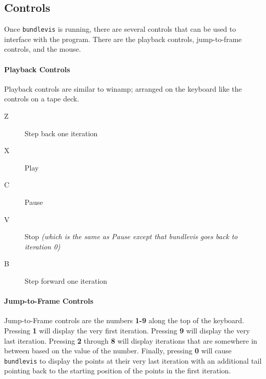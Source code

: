 \subsection{Controls}

Once \texttt{bundlevis} is running, there are several controls that
can be used to interface with the program. There are the playback
controls, jump-to-frame controls, and the mouse.

\paragraph{Playback Controls}

Playback controls are similar to winamp; arranged on the keyboard like
the controls on a tape deck.

\newenvironment{myindentpar}[1]
               {\begin{list}{}
                   {\setlength{\leftmargin}{#1}}
                 \item[]
               }
               {\end{list}}

\begin{myindentpar}{3cm}
\begin{description}
  \item[Z] Step back one iteration
  \item[X] Play
  \item[C] Pause
  \item[V] Stop \emph{(which is the same as Pause except that
    bundlevis goes back to iteration 0)}
  \item[B] Step forward one iteration
\end{description}
\end{myindentpar}

\paragraph{Jump-to-Frame Controls}
Jump-to-Frame controls are the numbers \textbf{1-9} along the top of
the keyboard. Pressing \textbf{1} will display the very first
iteration. Pressing \textbf{9} will display the very last
iteration. Pressing \textbf{2} through \textbf{8} will display
iterations that are somewhere in between based on the value of the
number. Finally, pressing \textbf{0} will cause \texttt{bundlevis} to
display the points at their very last iteration with an additional
tail pointing back to the starting position of the points in the first
iteration.

